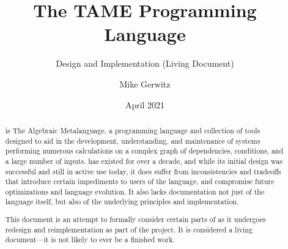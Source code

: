 \documentclass[draft,toc=index]{scrartcl}
\title{The TAME Programming Language}
\subtitle{Design and Implementation (Living Document)}
\author{Mike Gerwitz}
\date{April 2021}%
\begin{document}
\maketitle

\begin{abstract}
  \tame{} is The Algebraic Metalanguage, a programming language and
  collection of tools designed to aid in the development, understanding,
  and maintenance of systems performing numerous calculations on a
  complex graph of dependencies, conditions, and a large number of
  inputs.  \tame{} has existed for over a decade, and while its initial
  design was successful and still in active use today, it does suffer
  from inconsistencies and tradeoffs that introduce certain impediments
  to users of the language, and compromise future optimizations and
  language evolution.  It also lacks documentation not just of the
  language itself, but also of the underlying principles and
  implementation.

  This document is an attempt to formally consider certain parts of
  \tame{} as it undergoes redesign and reimplementation as part of the
  \tamer{} project.  It is considered a living document---it is not
  likely to ever be a finished work.
\end{abstract}


\tableofcontents




\clearpage
\printglossary[style=altlong4col]
\printindex
\end{document}
